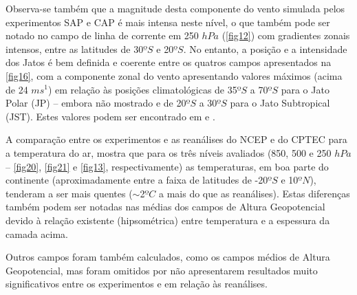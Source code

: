 Observa-se também que a magnitude desta componente do vento simulada pelos experimentos SAP e CAP é mais intensa neste nível, o que também pode ser notado no campo de linha de corrente em 250 $hPa$ (\autoref{fig12}) com gradientes zonais intensos, entre as latitudes de 30$ºS$ e 20$ºS$. No entanto, a posição e a intensidade dos Jatos é bem definida e coerente entre os quatros campos apresentados na \autoref{fig16}, com a componente zonal do vento apresentando valores máximos (acima de 24 $ms^{1}$) em relação às posições climatológicas de 35$ºS$ a 70$ºS$ para o Jato Polar (JP) – embora não mostrado e de 20$ºS$ a 30$ºS$ para o Jato Subtropical (JST). Estes valores podem ser encontrado em  e . 



A comparação entre os experimentos e as reanálises do NCEP e do CPTEC para a temperatura do ar, mostra que para os três níveis avaliados (850, 500 e 250 $hPa$ – \autoref{fig20}, \autoref{fig21} e \autoref{fig13}, respectivamente) as temperaturas, em boa parte do continente (aproximadamente entre a faixa de latitudes de -20$ºS$ e 10$ºN$), tenderam a ser mais quentes ($\sim$2$ºC$ a mais do que as reanálises). Estas diferenças também podem ser notadas nas médias dos campos de Altura Geopotencial devido à relação existente (hipsométrica) entre temperatura e a espessura da camada acima.



Outros campos foram também calculados, como os campos médios de Altura Geopotencial, mas foram omitidos por não apresentarem resultados muito significativos entre os experimentos e em relação às reanálises.

